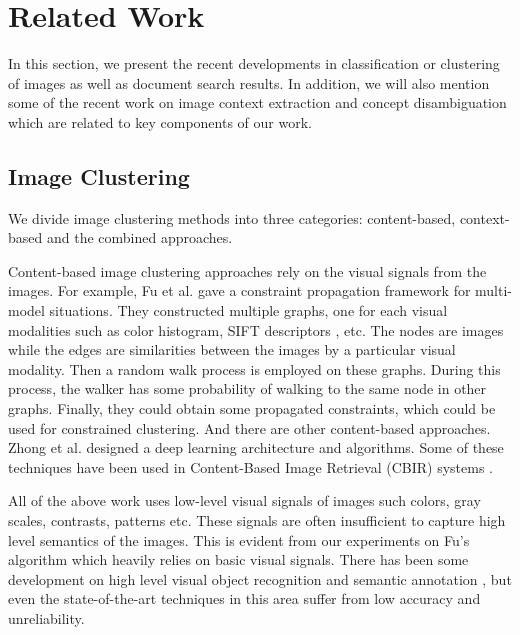 \section{Related Work}
\label{sec:related}

\newcommand{\QS}[1]{\textcolor{magenta}{[Qingyu: #1]}}

In this section, we present the recent developments in classification or clustering
of images as well as document search results. In addition, we will also mention
some of the recent work on image context extraction and concept disambiguation
which are related to key components of our work.

\subsection{Image Clustering}

We divide image clustering methods into three categories:
content-based, context-based and the combined approaches.

Content-based image clustering approaches \cite{FergusFPZ05,FanGL07,GaoFLS08}
rely on the visual signals from the images.
For example, Fu et al.\cite{Fu2011} gave a constraint propagation
framework for multi-model situations. They constructed multiple graphs,
one for each visual modalities
such as color histogram, SIFT descriptors \cite{Lowe99}, etc. The nodes are images
while the edges are similarities between the images by a particular visual modality.
Then a random walk process is employed on these graphs. During this process, the
walker has some probability of walking to the same node in other graphs. Finally,
they could obtain some propagated constraints, which could be used for
constrained clustering. And there are other content-based approaches.
Zhong et al.\cite{ZhongLL11} designed a deep learning architecture and algorithms.
Some of these techniques have been used in Content-Based Image Retrieval (CBIR)
systems \cite{Chang1984, Datta2008,ChenWK03,ChenWK05}. 

All of the above work uses low-level visual signals of images such colors,
gray scales, contrasts, patterns etc. These signals are often insufficient
to capture high level semantics of the images. This is evident from our
experiments on Fu's algorithm which heavily relies on basic visual signals.
There has been some development on high level visual object recognition
and semantic annotation \cite{Li09scene}, but even the state-of-the-art
techniques in this area suffer from low accuracy and unreliability.

